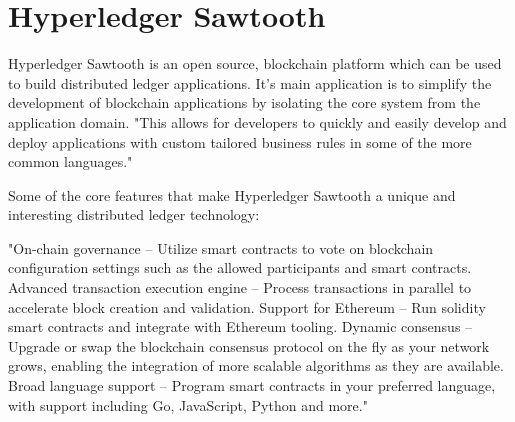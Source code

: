 \section{Hyperledger Sawtooth}

Hyperledger Sawtooth is an open source, blockchain platform which can be used 
to build distributed ledger applications. It’s main application is to simplify 
the development of blockchain applications by isolating the core system from the 
application domain. "This allows for developers to quickly and easily develop and
deploy applications with custom tailored business rules in some of the more 
common languages." \cite{Hyperledger Sawtooth}

Some of the core features that make Hyperledger Sawtooth a unique and interesting 
distributed  ledger technology:
  
  "On-chain governance – Utilize smart contracts to vote on blockchain configuration 
  settings such as the allowed participants and smart contracts.
  Advanced transaction execution engine – Process transactions in parallel to accelerate 
  block creation and validation.
  Support for Ethereum – Run solidity smart contracts and integrate with Ethereum tooling.
  Dynamic consensus – Upgrade or swap the blockchain consensus protocol on the fly as your 
  network grows, enabling the integration of more scalable algorithms as they are available.
  Broad language support – Program smart contracts in your preferred language, with support 
  including Go, JavaScript, Python and more." \cite{Linux Foundation Sawtooth}
